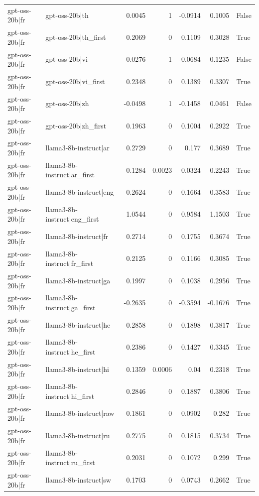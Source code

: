 \begin{table}
\begin{tabular}{l l r r r r l}
gpt-oss-20b|fr & gpt-oss-20b|th & 0.0045 & 1 & -0.0914 & 0.1005 & False \\
gpt-oss-20b|fr & gpt-oss-20b|th_first & 0.2069 & 0 & 0.1109 & 0.3028 & True \\
gpt-oss-20b|fr & gpt-oss-20b|vi & 0.0276 & 1 & -0.0684 & 0.1235 & False \\
gpt-oss-20b|fr & gpt-oss-20b|vi_first & 0.2348 & 0 & 0.1389 & 0.3307 & True \\
gpt-oss-20b|fr & gpt-oss-20b|zh & -0.0498 & 1 & -0.1458 & 0.0461 & False \\
gpt-oss-20b|fr & gpt-oss-20b|zh_first & 0.1963 & 0 & 0.1004 & 0.2922 & True \\
gpt-oss-20b|fr & llama3-8b-instruct|ar & 0.2729 & 0 & 0.177 & 0.3689 & True \\
gpt-oss-20b|fr & llama3-8b-instruct|ar_first & 0.1284 & 0.0023 & 0.0324 & 0.2243 & True \\
gpt-oss-20b|fr & llama3-8b-instruct|eng & 0.2624 & 0 & 0.1664 & 0.3583 & True \\
gpt-oss-20b|fr & llama3-8b-instruct|eng_first & 1.0544 & 0 & 0.9584 & 1.1503 & True \\
gpt-oss-20b|fr & llama3-8b-instruct|fr & 0.2714 & 0 & 0.1755 & 0.3674 & True \\
gpt-oss-20b|fr & llama3-8b-instruct|fr_first & 0.2125 & 0 & 0.1166 & 0.3085 & True \\
gpt-oss-20b|fr & llama3-8b-instruct|ga & 0.1997 & 0 & 0.1038 & 0.2956 & True \\
gpt-oss-20b|fr & llama3-8b-instruct|ga_first & -0.2635 & 0 & -0.3594 & -0.1676 & True \\
gpt-oss-20b|fr & llama3-8b-instruct|he & 0.2858 & 0 & 0.1898 & 0.3817 & True \\
gpt-oss-20b|fr & llama3-8b-instruct|he_first & 0.2386 & 0 & 0.1427 & 0.3345 & True \\
gpt-oss-20b|fr & llama3-8b-instruct|hi & 0.1359 & 0.0006 & 0.04 & 0.2318 & True \\
gpt-oss-20b|fr & llama3-8b-instruct|hi_first & 0.2846 & 0 & 0.1887 & 0.3806 & True \\
gpt-oss-20b|fr & llama3-8b-instruct|raw & 0.1861 & 0 & 0.0902 & 0.282 & True \\
gpt-oss-20b|fr & llama3-8b-instruct|ru & 0.2775 & 0 & 0.1815 & 0.3734 & True \\
gpt-oss-20b|fr & llama3-8b-instruct|ru_first & 0.2031 & 0 & 0.1072 & 0.299 & True \\
gpt-oss-20b|fr & llama3-8b-instruct|sw & 0.1703 & 0 & 0.0743 & 0.2662 & True \\

\end{tabular}
\end{table}
